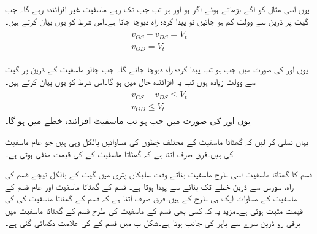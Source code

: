 یوں اسی مثال کو آگے بڑھاتے ہوئے اگر  ہو اور   ہو تب جب تک   رہے ماسفیٹ غیر افزائندہ رہے گا۔
جب گیٹ پر ڈرین سے  وولٹ کم ہو جائیں تو پیدا کردہ راہ دبوچا جاتا ہے۔اس شرط کو یوں بیان کرتے ہیں۔
\begin{gather}
\begin{aligned}
v_{GS}-v_{DS}=V_t\\
v_{GD} =V_t
\end{aligned}
\end{gather}

یوں   اور  کی صورت میں جب   ہو تب پیدا کردہ راہ دبوچا جائے گا۔
	جب چالو ماسفیٹ کے ڈرین پر گیٹ سے 	وولٹ زیادہ ہوں تب یہ افزائندہ حال میں ہو گا۔اس شرط کو یوں بیان کرتے ہیں۔
\begin{gather}
\begin{aligned}
v_{GS}-v_{DS} \le V_t \\
v_{GD} \le V_t
\end{aligned}
\end{gather}
یوں   اور   کی صورت میں جب  ہو تب ماسفیٹ افزائندہ خطے میں ہو گا۔

یہاں تسلی کر لیں کہ گھٹاتا ماسفیٹ کے مختلف خِطوں کی مساواتیں بالکل وہی ہیں جو عام ماسفیٹ کی ہیں۔فرق صرف اتنا ہے کہ گھٹاتا ماسفیٹ کے  کی قیمت منفی ہوتی ہے۔

 قسم کا گھٹاتا ماسفیٹ اسی طرح  ماسفیٹ بناتے وقت سلیکان پتری میں گیٹ کے بالکل نیچے  قسم کی راہ، سورس سے ڈرین خطے تک بنانے سے پیدا ہوتا ہے۔  قسم کے گھٹاتا ماسفیٹ اور عام  قسم کے ماسفیٹ کے مساوات ایک ہی طرح کے ہیں۔فرق صرف اتنا ہے کہ   قسم کے گھٹاتا ماسفیٹ کی  کی قیمت مثبت ہوتی ہے۔مزید یہ کہ کسی بھی  قسم کے ماسفیٹ کی طرح   قسم کے گھٹاتا ماسفیٹ میں برقی رو ڈرین سرے سے باہر کی جانب ہوتا ہے۔شکل  ب میں  قسم کے  کی علامت دکھائی گئی ہے۔

